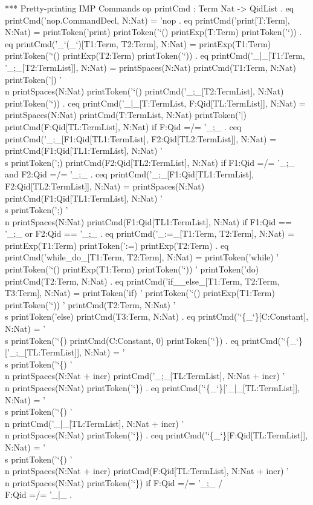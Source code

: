\documentclass{llncs}%
\begin{document}
 *** Pretty-printing IMP Commands
 op printCmd : Term Nat -> QidList .
 eq printCmd('nop.CommandDecl, N:Nat) = 'nop .
 eq printCmd('print[T:Term], N:Nat) =
    printToken('print) printToken('`() printExp(T:Term) printToken('`)) .
 eq printCmd('_`(_`)[T1:Term, T2:Term], N:Nat) =
    printExp(T1:Term) printToken('`() printExp(T2:Term) printToken('`)) .
 eq printCmd('_|_[T1:Term, '_;_[T2:TermList]], N:Nat) =
    printSpaces(N:Nat)
    printCmd(T1:Term, N:Nat) printToken('|) '\\n
    printSpaces(N:Nat) printToken('`() 
    printCmd('_;_[T2:TermList], N:Nat) printToken('`)) .
ceq printCmd('_|_[T:TermList, F:Qid[TL:TermList]], N:Nat) =
    printSpaces(N:Nat) printCmd(T:TermList, N:Nat) printToken('|)
    printCmd(F:Qid[TL:TermList], N:Nat)
 if F:Qid =/= '_;_ .
ceq printCmd('_;_[F1:Qid[TL1:TermList], F2:Qid[TL2:TermList]], N:Nat) =
    printCmd(F1:Qid[TL1:TermList], N:Nat) '\\s printToken(';)
    printCmd(F2:Qid[TL2:TermList], N:Nat)
 if F1:Qid =/= '_;_ and F2:Qid =/= '_;_ .
ceq printCmd('_;_[F1:Qid[TL1:TermList], F2:Qid[TL2:TermList]], N:Nat) =
    printSpaces(N:Nat) 
    printCmd(F1:Qid[TL1:TermList], N:Nat) '\\s printToken(';) '\\n
    printSpaces(N:Nat) 
    printCmd(F1:Qid[TL1:TermList], N:Nat)
 if F1:Qid == '_;_ or F2:Qid == '_;_ .
 eq printCmd('_:=_[T1:Term, T2:Term], N:Nat) =
    printExp(T1:Term) printToken(':=) printExp(T2:Term) .
 eq printCmd('while_do_[T1:Term, T2:Term], N:Nat) =
    printToken('while) ' printToken('`() printExp(T1:Term) printToken('`)) '
    printToken('do)
    printCmd(T2:Term, N:Nat) .
 eq printCmd('if__else_[T1:Term, T2:Term, T3:Term], N:Nat) =
    printToken('if) ' printToken('`() printExp(T1:Term) printToken('`)) '
    printCmd(T2:Term, N:Nat)
    '\\s printToken('else) printCmd(T3:Term, N:Nat) .
 eq printCmd('`\{_`\}[C:Constant], N:Nat) =
    '\\s printToken('`\{) 
    printCmd(C:Constant, 0) 
    printToken('`\}) .
 eq printCmd('`\{_`\}['_;_[TL:TermList]], N:Nat) =
    '\\s printToken('`\{) '\\n
    printSpaces(N:Nat + incr) 
    printCmd('_;_[TL:TermList], N:Nat + incr) '\\n
    printSpaces(N:Nat) printToken('`\}) .
 eq printCmd('`\{_`\}['_|_[TL:TermList]], N:Nat) =
    '\\s printToken('`\{) '\\n 
    printCmd('_|_[TL:TermList], N:Nat + incr) '\\n
    printSpaces(N:Nat) printToken('`\}) .
ceq printCmd('`\{_`\}[F:Qid[TL:TermList]], N:Nat) =
    '\\s printToken('`\{) '\\n
    printSpaces(N:Nat + incr) 
    printCmd(F:Qid[TL:TermList], N:Nat + incr) '\\n
    printSpaces(N:Nat) printToken('`\})
 if F:Qid =/= '_;_ /\\ F:Qid =/= '_|_ .
\end{document}
